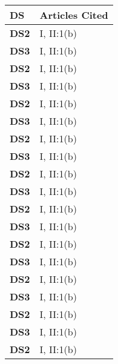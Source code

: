 
\begin{xltabular}{\linewidth}{ l | X }
    \hline 

    \textbf{\normalsize DS} & \textbf{\normalsize Articles Cited}  \\
    \endfirsthead
    \hline \hline

    \textbf{DS2} & I, II:1(b) \\ \hline

    \textbf{DS3} & I, II:1(b) \\ \hline

    \textbf{DS2} & I, II:1(b) \\ \hline

    \textbf{DS3} & I, II:1(b) \\ \hline

    \textbf{DS2} & I, II:1(b) \\ \hline

    \textbf{DS3} & I, II:1(b) \\ \hline

    \textbf{DS2} & I, II:1(b) \\ \hline

    \textbf{DS3} & I, II:1(b) \\ \hline

    \textbf{DS2} & I, II:1(b) \\ \hline

    \textbf{DS3} & I, II:1(b) \\ \hline

    \textbf{DS2} & I, II:1(b) \\ \hline

    \textbf{DS3} & I, II:1(b) \\ \hline

    \textbf{DS2} & I, II:1(b) \\ \hline

    \textbf{DS3} & I, II:1(b) \\ \hline

    \textbf{DS2} & I, II:1(b) \\ \hline

    \textbf{DS3} & I, II:1(b) \\ \hline

    \textbf{DS2} & I, II:1(b) \\ \hline

    \textbf{DS3} & I, II:1(b) \\ \hline

    \textbf{DS2} & I, II:1(b) \\ \hline


\end{xltabular}
